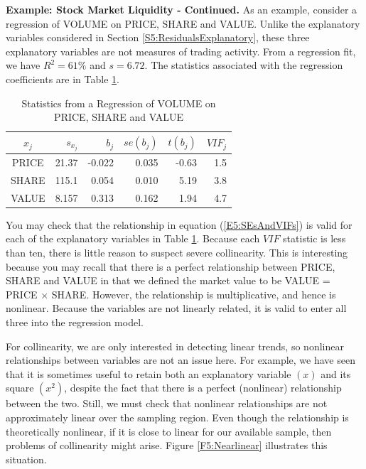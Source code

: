 \linejed{}

\textbf{Example: Stock Market Liquidity - Continued.} As an example,
consider a regression of VOLUME on PRICE, SHARE and VALUE. Unlike
the explanatory variables considered in Section
\ref{S5:ResidualsExplanatory}, these three explanatory variables are
not measures of trading activity. From a regression fit, we have
$R^2=61\%$ and $s=6.72$. The statistics associated with the
regression coefficients are in Table \ref{T5:LiquidRegression}.


\begin{table}[h]
\caption{\label{T5:LiquidRegression} Statistics from
a Regression of VOLUME on PRICE, SHARE and VALUE}

\begin{tabular}{crrrrr}
\hline
$x_j$ & $s_{x_j}$ & $b_j$ & $se(b_j)$ & $t(b_j)$ & $VIF_j$ \\
\hline PRICE& 21.37 & -0.022 & 0.035&
-0.63& 1.5 \\
SHARE & 115.1 & 0.054 & 0.010 &
5.19 & 3.8 \\
VALUE & 8.157 & 0.313 & 0.162 & 1.94 & 4.7
\\ \hline
\end{tabular}
\end{table}

You may check that the relationship in equation
(\ref{E5:SEsAndVIFs}) is valid for each of the explanatory variables
in Table \ref{T5:LiquidRegression}. Because each $VIF$ statistic is
less than ten, there is little reason to suspect severe
collinearity. This is interesting because you may recall that there
is a perfect relationship between PRICE, SHARE and VALUE in that we
defined the market value to be VALUE = PRICE $\times $ SHARE.
However, the relationship is multiplicative, and hence is nonlinear.
Because the variables are not linearly related, it is valid to enter
all three into the regression model.

\linejed

For collinearity, we are only interested in detecting linear trends,
so nonlinear relationships between variables are not an issue here.
For example, we have seen that it is sometimes useful to retain both
an explanatory variable $(x)$ and its square $(x^2)$, despite the
fact that there is a perfect (nonlinear) relationship between the
two. Still, we must check that nonlinear relationships are not
approximately linear over the sampling region. Even though the
relationship is theoretically nonlinear, if it is close to linear
for our available sample, then problems of collinearity might arise.
Figure \ref{F5:Nearlinear} illustrates this situation.


